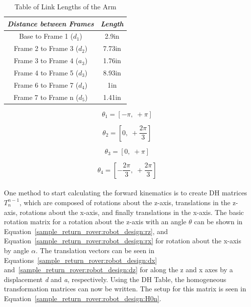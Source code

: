 \begin{table}[H]
	\centering
	\begin{tabular}{|c|c|}
		\hline
		\textit{Distance between Frames} & \textit{Length} \\
		\hline
		Base to Frame 1 ($d_{1}$) & 2.9in \\
		Frame 2 to Frame 3 ($d_{2}$) & 7.73in \\
		Frame 3 to Frame 4 ($a_{3}$) & 1.76in \\
		Frame 4 to Frame 5 ($d_{3}$) & 8.93in \\
		Frame 6 to Frame 7 ($d_{4}$) & 1in \\
		Frame 7 to Frame n ($d_{5}$) & 1.41in \\
		\hline
	\end{tabular}
	\label{sample_return_rover:robot_design:dh_values}
	\caption{Table of Link Lengths of the Arm}
\end{table}

\begin{equation}\label{sample_return_rover:robot_design:th1}
	\theta_{1} = [-\pi,\; + \pi]
\end{equation}

\begin{equation}\label{sample_return_rover:robot_design:th2}
	\theta_{2} = \left[0,\; +\frac{2\pi}{3}\right]
\end{equation}

\begin{equation}\label{sample_return_rover:robot_design:th3}
	\theta_{3} = [0,\; + \pi]
\end{equation}	

\begin{equation}\label{sample_return_rover:robot_design:th4}
	\theta_{4} = \left[-\frac{2\pi}{3},\; +\frac{2\pi}{3}\right]
\end{equation} \\

One method to start calculating the forward kinematics is to create DH matrices $T^{n-1}_{n}$, which are composed of rotations about the z-axis, translations in the z-axis, rotations about the x-axis, and finally translations in the x-axis. The basic rotation matrix for a rotation about the z-axis with an angle $\theta$ can be shown in Equation~\ref{sample_return_rover:robot_design:rz}, and Equation~\ref{sample_return_rover:robot_design:rx} for rotation about the x-axis by angle $\alpha$. The translation vectors can be seen in Equations~\ref{sample_return_rover:robot_design:dx} and~\ref{sample_return_rover:robot_design:dz} for along the z and x axes by a displacement \textit{d} and \textit{a}, respectively. Using the DH Table, the homogeneous transformation matrices can now be written. The setup for this matrix is seen in Equation~\ref{sample_return_rover:robot_design:H0n}.

